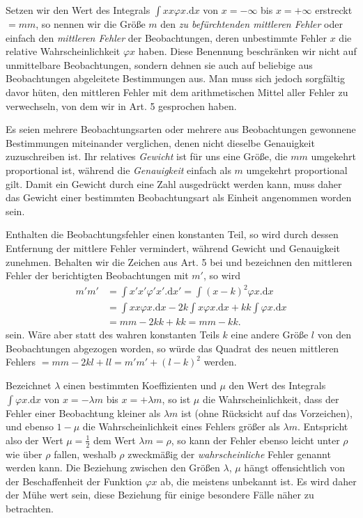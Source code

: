 Setzen wir den Wert des Integrals \(\int xx\varphi x.\mathrm{d}x\) von \(x=-\infty\) bis \(x=+\infty\) erstreckt \(=mm\), so nennen wir die Größe \(m\) den \textit{zu befürchtenden mittleren Fehler} oder einfach den \textit{mittleren Fehler} der Beobachtungen, deren unbestimmte Fehler \(x\) die relative Wahrscheinlichkeit \(\varphi x\) haben. Diese Benennung beschränken wir nicht auf unmittelbare Beobachtungen, sondern dehnen sie auch auf beliebige aus Beobachtungen abgeleitete Bestimmungen aus. Man muss sich jedoch sorgfältig davor hüten, den mittleren Fehler mit dem arithmetischen Mittel aller Fehler zu verwechseln, von dem wir in Art. 5 gesprochen haben.

Es seien mehrere Beobachtungsarten oder mehrere aus Beobachtungen gewonnene Bestimmungen miteinander verglichen, denen nicht dieselbe Genauigkeit zuzuschreiben ist. Ihr relatives \textit{Gewicht} ist für uns eine Größe, die \(mm\) umgekehrt proportional ist, während die \textit{Genauigkeit} einfach als \(m\) umgekehrt proportional gilt. Damit ein Gewicht durch eine Zahl ausgedrückt werden kann, muss daher das Gewicht einer bestimmten Beobachtungsart als Einheit angenommen worden sein.

Enthalten die Beobachtungsfehler einen konstanten Teil, so wird durch dessen Entfernung der mittlere Fehler vermindert, während Gewicht und Genauigkeit zunehmen. Behalten wir die Zeichen aus Art. 5 bei und bezeichnen den mittleren Fehler der berichtigten Beobachtungen mit \(m'\), so wird
\[
\begin{aligned}
m'm'&=\int x'x'\varphi'x'.\mathrm{d}x'=\int(x-k)^2\varphi x.\mathrm{d}x\\
&=\int xx\varphi x.\mathrm{d}x-2k\int x\varphi x.\mathrm{d}x+kk\int\varphi x.\mathrm{d}x\\
&=mm-2kk+kk=mm-kk.
\end{aligned}
\]
sein. Wäre aber statt des wahren konstanten Teils \(k\) eine andere Größe \(l\) von den Beobachtungen abgezogen worden, so würde das Quadrat des neuen mittleren Fehlers \(=mm-2kl+ll=m'm'+(l-k)^2\) werden.

Bezeichnet \(\lambda\) einen bestimmten Koeffizienten und \(\mu\) den Wert des Integrals \(\int\varphi x.\mathrm{d}x\) von \(x=-\lambda m\) bis \(x=+\lambda m\), so ist \(\mu\) die Wahrscheinlichkeit, dass der Fehler einer Beobachtung kleiner als \(\lambda m\) ist (ohne Rücksicht auf das Vorzeichen), und ebenso \(1-\mu\) die Wahrscheinlichkeit eines Fehlers größer als \(\lambda m\). Entspricht also der Wert \(\mu=\tfrac12\) dem Wert \(\lambda m=\rho\), so kann der Fehler ebenso leicht unter \(\rho\) wie über \(\rho\) fallen, weshalb \(\rho\) zweckmäßig der \textit{wahrscheinliche} Fehler genannt werden kann. Die Beziehung zwischen den Größen \(\lambda\), \(\mu\) hängt offensichtlich von der Beschaffenheit der Funktion \(\varphi x\) ab, die meistens unbekannt ist. Es wird daher der Mühe wert sein, diese Beziehung für einige besondere Fälle näher zu betrachten.

